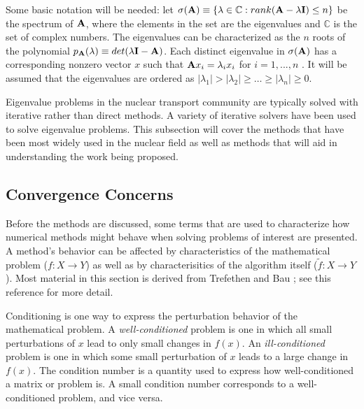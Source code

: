 Some basic notation will be needed: let $\sigma(\mathbf{A}) \equiv \{\lambda \in \mathbb{C} : rank(\mathbf{A} - \lambda \mathbf{I}) \le n\}$ be the spectrum of $\mathbf{A}$, where the elements in the set are the eigenvalues and $\mathbb{C}$ is the set of complex numbers. The eigenvalues can be characterized as the $n$ roots of the polynomial $p_{\mathbf{A}}(\lambda) \equiv det(\lambda \mathbf{I} - \mathbf{A})$. Each distinct eigenvalue in $\sigma(\mathbf{A})$ has a corresponding nonzero vector $x$ such that $\mathbf{A}x_{i} = \lambda_{i} x_{i}$ for $i = 1,...,n$ \cite{Sorensen1996}. It will be assumed that the eigenvalues are ordered as $|\lambda_{1}| > |\lambda_{2}| \ge \dots \ge |\lambda_{n}| \ge 0$. 

Eigenvalue problems in the nuclear transport community are typically solved with iterative rather than direct methods. A variety of iterative solvers have been used to solve eigenvalue problems. This subsection will cover the methods that have been most widely used in the nuclear field as well as methods that will aid in understanding the work being proposed. 

\subsection{Convergence Concerns}
Before the methods are discussed, some terms that are used to characterize how numerical methods might behave when solving problems of interest are presented. A method's behavior can be affected by characteristics of the mathematical problem ($f : X \to Y$) as well as by characterisitics of the algorithm itself ($\tilde f : X \to Y$). Most material in this section is derived from Trefethen and Bau \cite{Trefethen1997}; see this reference for more detail.

Conditioning is one way to express the perturbation behavior of the mathematical problem. A \emph{well-conditioned} problem is one in which all small perturbations of $x$ lead to only small changes in $f(x)$. An \emph{ill-conditioned} problem is one in which some small perturbation of $x$ leads to a large change in $f(x)$. The condition number is a quantity used to express how well-conditioned a matrix or problem is. A small condition number corresponds to a well-conditioned problem, and vice versa. 

